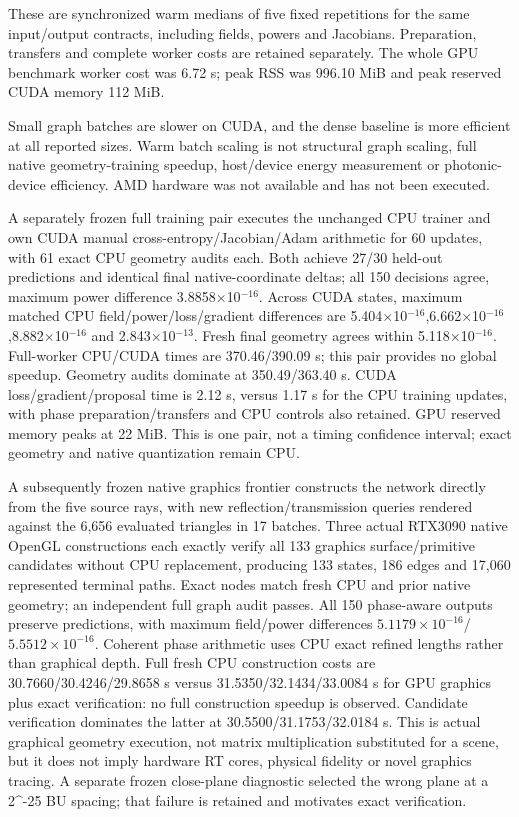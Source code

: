 \documentclass[11pt]{article}
\begin{document}
These are synchronized warm medians of five fixed repetitions for the same input/output contracts, including fields, powers and Jacobians. Preparation, transfers and complete worker costs are retained separately. The whole GPU benchmark worker cost was 6.72 s; peak RSS was 996.10 MiB and peak reserved CUDA memory 112 MiB.

Small graph batches are slower on CUDA, and the dense baseline is more efficient at all reported sizes. Warm batch scaling is not structural graph scaling, full native geometry-training speedup, host/device energy measurement or photonic-device efficiency. AMD hardware was not available and has not been executed.

A separately frozen full training pair executes the unchanged CPU trainer and own CUDA manual cross-entropy/Jacobian/Adam arithmetic for 60 updates, with 61 exact CPU geometry audits each. Both achieve 27/30 held-out predictions and identical final native-coordinate deltas; all 150 decisions agree, maximum power difference 3.8858$\times$10$^{-16}$. Across CUDA states, maximum matched CPU field/power/loss/gradient differences are 5.404$\times$10$^{-16}$,6.662$\times$10$^{-16}$,8.882$\times$10$^{-16}$ and 2.843$\times$10$^{-13}$. Fresh final geometry agrees within 5.118$\times$10$^{-16}$. Full-worker CPU/CUDA times are 370.46/390.09 s; this pair provides no global speedup. Geometry audits dominate at 350.49/363.40 s. CUDA loss/gradient/proposal time is 2.12 s, versus 1.17 s for the CPU training updates, with phase preparation/transfers and CPU controls also retained. GPU reserved memory peaks at 22 MiB. This is one pair, not a timing confidence interval; exact geometry and native quantization remain CPU.

A subsequently frozen native graphics frontier constructs the network directly from the five source rays, with new reflection/transmission queries rendered against the 6,656 evaluated triangles in 17 batches. Three actual RTX3090 native OpenGL constructions each exactly verify all 133 graphics surface/primitive candidates without CPU replacement, producing 133 states, 186 edges and 17,060 represented terminal paths. Exact nodes match fresh CPU and prior native geometry; an independent full graph audit passes. All 150 phase-aware outputs preserve predictions, with maximum field/power differences $5.1179\times10^{-16}$/$5.5512\times10^{-16}$. Coherent phase arithmetic uses CPU exact refined lengths rather than graphical depth. Full fresh CPU construction costs are 30.7660/30.4246/29.8658 s versus 31.5350/32.1434/33.0084 s for GPU graphics plus exact verification: no full construction speedup is observed. Candidate verification dominates the latter at 30.5500/31.1753/32.0184 s. This is actual graphical geometry execution, not matrix multiplication substituted for a scene, but it does not imply hardware RT cores, physical fidelity or novel graphics tracing. A separate frozen close-plane diagnostic selected the wrong plane at a 2\textasciicircum{}-25 BU spacing; that failure is retained and motivates exact verification.
\end{document}
